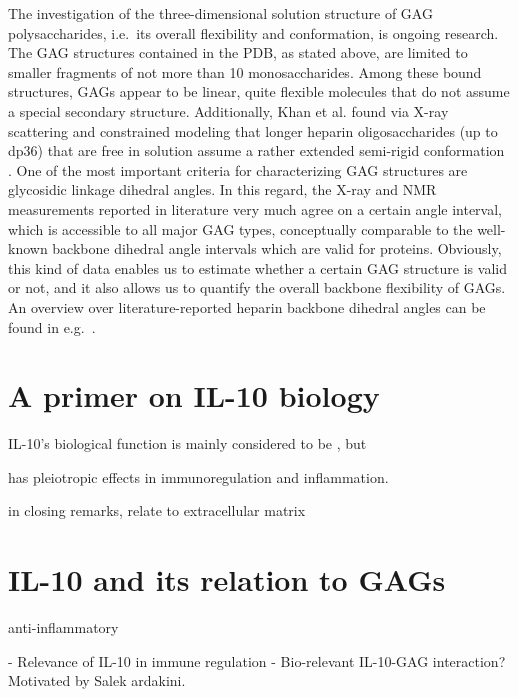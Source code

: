 The investigation of the three-dimensional solution structure of GAG
polysaccharides, i.e.\ its overall flexibility and conformation, is ongoing
research. The GAG structures contained in the PDB, as stated above, are limited
to smaller fragments of not more than 10 monosaccharides. Among these bound
structures, GAGs appear to be linear, quite flexible molecules that do not
assume a special secondary structure. Additionally, Khan et al. found via X-ray
scattering and constrained modeling that longer heparin oligosaccharides (up to
dp36) that are free in solution assume a rather extended semi-rigid conformation
\cite{semi_rigid_heparin_structures_2010}. One of the most important criteria
for characterizing GAG structures are glycosidic linkage dihedral angles. In
this regard, the X-ray and NMR measurements reported in literature very much
agree on a certain angle interval, which is accessible to all major GAG types,
conceptually comparable to the well-known backbone dihedral angle intervals
which are valid for proteins. Obviously, this kind of data enables us to
estimate whether a certain GAG structure is valid or not, and it also allows us
to quantify the overall backbone flexibility of GAGs. An overview over
literature-reported heparin backbone dihedral angles can be found in e.g.\
\cite{semi_rigid_heparin_structures_2010}.



\section{A primer on IL-10 biology}

 IL-10's biological function is mainly considered to be
, but

 has pleiotropic effects in immunoregulation and
inflammation.


        in closing remarks, relate to extracellular matrix




\section{IL-10 and its relation to GAGs}


 anti-inflammatory

- Relevance of IL-10 in immune regulation
- Bio-relevant IL-10-GAG interaction? Motivated by Salek ardakini.

